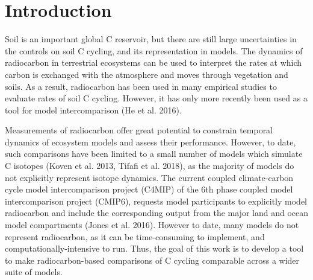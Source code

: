 \documentclass[11pt,a4paper]{article}
\newcommand{\gray}[1]{\textcolor{gray}{#1}}
\begin{document}
\newpage

\section*{Introduction}

Soil is an important global C reservoir, but there are still large uncertainties in the controls on soil C cycling, and its representation in models. The dynamics of radiocarbon in terrestrial ecosystems can be used to interpret the rates at which carbon is exchanged with the atmosphere and moves through vegetation and soils. As a result, radiocarbon has been used in many empirical studies to evaluate rates of soil C cycling. However, it has only more recently been used as a tool for model intercomparison (He et al. 2016). 

Measurements of radiocarbon offer great potential to constrain temporal dynamics of ecosystem models and assess their performance. However, to date, such comparisons have been limited to a small number of models which simulate C isotopes (Koven et al. 2013, Tifafi et al. 2018), as the majority of models do not explicitly represent isotope dynamics. The current coupled climate-carbon cycle model intercomparison project (C4MIP) of the 6th phase coupled model intercomparison project (CMIP6), requests model participants to explicitly model radiocarbon and include the corresponding output from the major land and ocean model compartments (Jones et al. 2016). However to date, many models do not represent radiocarbon, as it can be time-consuming to implement, and computationally-intensive to run. Thus, the goal of this work is to develop a tool to make radiocarbon-based comparisons of C cycling comparable across a wider suite of models.
\end{document}
